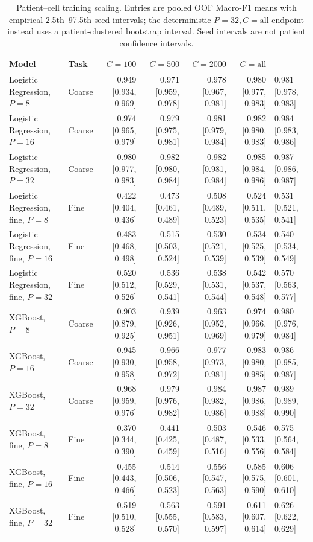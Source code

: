 \begin{table}[t]
\centering
\small
\begin{tabular}{llrrrr}
\toprule
Model & Task & $C=100$ & $C=500$ & $C=2000$ & $C=\mathrm{all}$ \\
\midrule
Logistic Regression, $P=8$ & Coarse & 0.949 [0.934, 0.969] & 0.971 [0.959, 0.978] & 0.978 [0.967, 0.981] & 0.980 [0.977, 0.983] & 0.981 [0.978, 0.983] \\
Logistic Regression, $P=16$ & Coarse & 0.974 [0.965, 0.979] & 0.979 [0.975, 0.981] & 0.981 [0.979, 0.984] & 0.982 [0.980, 0.983] & 0.984 [0.983, 0.986] \\
Logistic Regression, $P=32$ & Coarse & 0.980 [0.977, 0.983] & 0.982 [0.980, 0.984] & 0.982 [0.981, 0.984] & 0.985 [0.984, 0.986] & 0.987 [0.986, 0.987] \\
Logistic Regression, fine, $P=8$ & Fine & 0.422 [0.404, 0.436] & 0.473 [0.461, 0.489] & 0.508 [0.489, 0.523] & 0.524 [0.511, 0.535] & 0.531 [0.521, 0.541] \\
Logistic Regression, fine, $P=16$ & Fine & 0.483 [0.468, 0.498] & 0.515 [0.503, 0.524] & 0.530 [0.521, 0.539] & 0.534 [0.525, 0.539] & 0.540 [0.534, 0.549] \\
Logistic Regression, fine, $P=32$ & Fine & 0.520 [0.512, 0.526] & 0.536 [0.529, 0.541] & 0.538 [0.531, 0.544] & 0.542 [0.537, 0.548] & 0.570 [0.563, 0.577] \\
\midrule
XGBoost, $P=8$ & Coarse & 0.903 [0.879, 0.925] & 0.939 [0.926, 0.951] & 0.963 [0.952, 0.969] & 0.974 [0.966, 0.979] & 0.980 [0.976, 0.984] \\
XGBoost, $P=16$ & Coarse & 0.945 [0.930, 0.958] & 0.966 [0.958, 0.972] & 0.977 [0.973, 0.981] & 0.983 [0.980, 0.985] & 0.986 [0.985, 0.987] \\
XGBoost, $P=32$ & Coarse & 0.968 [0.959, 0.976] & 0.979 [0.976, 0.982] & 0.984 [0.982, 0.986] & 0.987 [0.986, 0.988] & 0.989 [0.989, 0.990] \\
XGBoost, fine, $P=8$ & Fine & 0.370 [0.344, 0.390] & 0.441 [0.425, 0.459] & 0.503 [0.487, 0.516] & 0.546 [0.533, 0.556] & 0.575 [0.564, 0.584] \\
XGBoost, fine, $P=16$ & Fine & 0.455 [0.443, 0.466] & 0.514 [0.506, 0.523] & 0.556 [0.547, 0.563] & 0.585 [0.575, 0.590] & 0.606 [0.601, 0.610] \\
XGBoost, fine, $P=32$ & Fine & 0.519 [0.510, 0.528] & 0.563 [0.555, 0.570] & 0.591 [0.583, 0.597] & 0.611 [0.607, 0.614] & 0.626 [0.622, 0.629] \\
\midrule
\bottomrule
\end{tabular}
\caption{Patient--cell training scaling. Entries are pooled OOF Macro-F1 means with empirical 2.5th--97.5th seed intervals; the deterministic $P=32,C=\mathrm{all}$ endpoint instead uses a patient-clustered bootstrap interval. Seed intervals are not patient confidence intervals.}
\label{tab:patient_cell_scaling}
\end{table}
